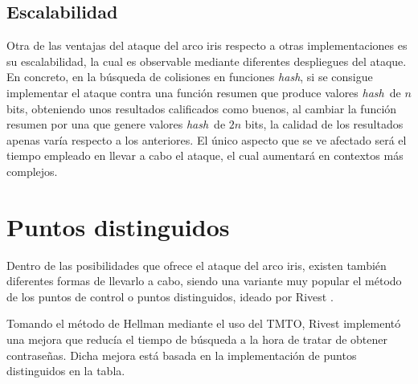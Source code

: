 \documentclass[12pt,spanish,listoffigures,listoftables,listofalgorithms]{tfgetsinf}
\newcommand{\hash}{\textit{hash}}
\begin{document}
\subsection{Escalabilidad}

Otra de las ventajas del ataque del arco iris respecto a otras implementaciones es su escalabilidad, la cual es observable mediante diferentes despliegues del ataque. En concreto, en la búsqueda de colisiones en funciones \hash, si se consigue implementar el ataque contra una función resumen que produce valores \hash~de $n$ bits, obteniendo unos resultados calificados como buenos, al cambiar la función resumen por una que genere valores \hash~de $2n$ bits, la calidad de los resultados apenas varía respecto a los anteriores. El único aspecto que se ve afectado será el tiempo empleado en llevar a cabo el ataque, el cual aumentará en contextos más complejos.

\section{Puntos distinguidos}

Dentro de las posibilidades que ofrece el ataque del arco iris, existen también diferentes formas de llevarlo a cabo, siendo una variante muy popular el método de los puntos de control o puntos distinguidos, ideado por Rivest \cite{rivest}.

Tomando el método de Hellman \cite{hellman} mediante el uso del TMTO, Rivest implementó una mejora que reducía el tiempo de búsqueda a la hora de tratar de obtener contraseñas. Dicha mejora está basada en la implementación de puntos distinguidos en la tabla.
\end{document}
